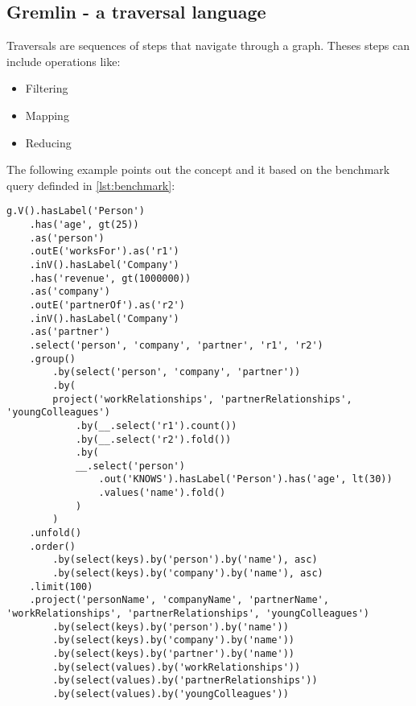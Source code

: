 \subsection{Gremlin - a traversal language}
Traversals are sequences of steps that navigate through a graph. Theses steps can include operations
like:
\begin{itemize}
	\item Filtering
	\item Mapping 
	\item Reducing
\end{itemize}
The following example points out the concept and it based on the benchmark query definded in \cref{lst:benchmark}:
\begin{lstlisting}[caption={Benchmark Query in Gremlin}, label={lst:benchmarkGremlin}] 
	g.V().hasLabel('Person')
	.has('age', gt(25))
	.as('person')
	.outE('worksFor').as('r1')
	.inV().hasLabel('Company')
	.has('revenue', gt(1000000))
	.as('company')
	.outE('partnerOf').as('r2')
	.inV().hasLabel('Company')
	.as('partner')
	.select('person', 'company', 'partner', 'r1', 'r2')
	.group()
		.by(select('person', 'company', 'partner'))
		.by(
		project('workRelationships', 'partnerRelationships', 'youngColleagues')
			.by(__.select('r1').count())
			.by(__.select('r2').fold())
			.by(
			__.select('person')
				.out('KNOWS').hasLabel('Person').has('age', lt(30))
				.values('name').fold()
			)
		)
	.unfold()
	.order()
		.by(select(keys).by('person').by('name'), asc)
		.by(select(keys).by('company').by('name'), asc)
	.limit(100)
	.project('personName', 'companyName', 'partnerName', 'workRelationships', 'partnerRelationships', 'youngColleagues')
		.by(select(keys).by('person').by('name'))
		.by(select(keys).by('company').by('name'))
		.by(select(keys).by('partner').by('name'))
		.by(select(values).by('workRelationships'))
		.by(select(values).by('partnerRelationships'))
		.by(select(values).by('youngColleagues'))
\end{lstlisting}
